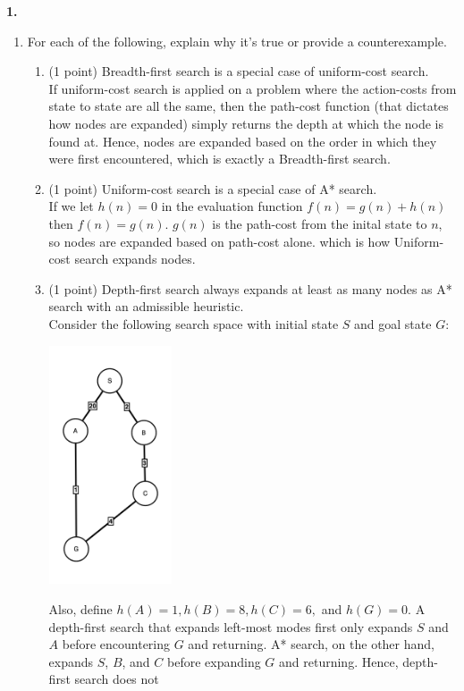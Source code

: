 \documentclass[12pt]{amsart}
\newenvironment{statement}[1]{\smallskip\noindent\color[rgb]{0.0,0.0,0.0} {\bf #1.}}{}
\theoremstyle{definition}
\theoremstyle{remark}
\newcommand{\1}{\mathds{1}}
\begin{document}
\begin{statement}{1}
\begin{enumerate}
    \item  For each of the following, explain why it's true or provide a counterexample.
    \begin{enumerate}
        \item (1 point) Breadth-first search is a special case of uniform-cost search.
        \\If uniform-cost search is applied on a problem where the action-costs from state to state are all the same, then the path-cost function (that 
        dictates how nodes are expanded) simply returns the depth at which the node is found at. Hence, nodes are expanded based on the order in which they 
        were first encountered, which is exactly a Breadth-first search.
        \item (1 point) Uniform-cost search is a special case of A* search. %
        \\ If we let $h(n) = 0$ in the evaluation function $f(n) = g(n) + h(n)$ then $f(n) = g(n)$. $g(n)$ is the path-cost from the inital state to 
        $n$, so nodes are expanded based on path-cost alone. which is how Uniform-cost search expands nodes.
        \item (1 point) Depth-first search always expands at least as many nodes as A* search with an admissible heuristic.
        \\Consider the following search space with initial state $S$ and goal state $G$: 
        \begin{center}
            \includegraphics[width=0.3\textwidth]{images/graph.png}
        \end{center}
        Also, define $h(A) = 1, h(B) = 8, h(C)=6,$ and $h(G)= 0$. A depth-first search that expands left-most modes first only expands $S$ and $A$ 
        before encountering $G$ and returning. A* search, on the other hand, expands $S$, $B$, and $C$ before expanding $G$ and returning. Hence, depth-first search does not 

\end{enumerate}
\end{enumerate}
\end{statement}
\end{document}
